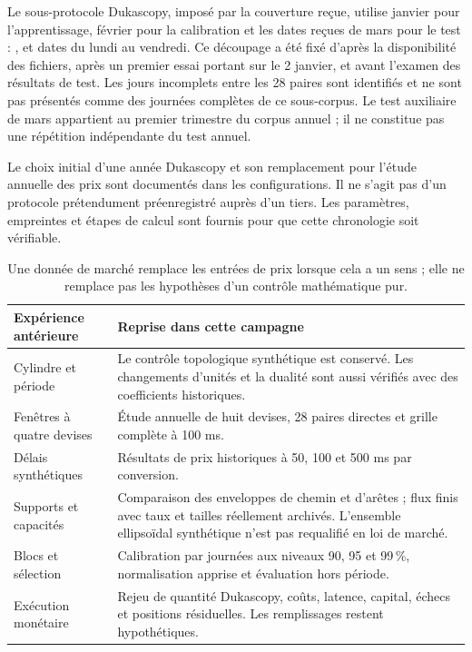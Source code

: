 Le sous-protocole Dukascopy, imposé par la couverture reçue, utilise janvier pour l'apprentissage, février pour la calibration et les dates reçues de mars pour le test : \EmpDukaTrain{}, \EmpDukaCal{} et \EmpDukaTest{} dates du lundi au vendredi. Ce découpage a été fixé d'après la disponibilité des fichiers, après un premier essai portant sur le 2 janvier, et avant l'examen des résultats de test. Les jours incomplets entre les 28 paires sont identifiés et ne sont pas présentés comme des journées complètes de ce sous-corpus. Le test auxiliaire de mars appartient au premier trimestre du corpus annuel ; il ne constitue pas une répétition indépendante du test annuel.

Le choix initial d'une année Dukascopy et son remplacement pour l'étude annuelle des prix sont documentés dans les configurations. Il ne s'agit pas d'un protocole prétendument préenregistré auprès d'un tiers. Les paramètres, empreintes et étapes de calcul sont fournis pour que cette chronologie soit vérifiable.

\begin{table}[H]\centering\small
\begin{tabularx}{\linewidth}{@{}p{35mm}Y@{}}
\toprule
Expérience antérieure & Reprise dans cette campagne\\
\midrule
Cylindre et période & Le contrôle topologique synthétique est conservé. Les changements d'unités et la dualité sont aussi vérifiés avec des coefficients historiques.\\
Fenêtres à quatre devises & Étude annuelle de huit devises, 28 paires directes et grille complète à 100 ms.\\
Délais synthétiques & Résultats de prix historiques à 50, 100 et 500 ms par conversion.\\
Supports et capacités & Comparaison des enveloppes de chemin et d'arêtes ; flux finis avec taux et tailles réellement archivés. L'ensemble ellipsoïdal synthétique n'est pas requalifié en loi de marché.\\
Blocs et sélection & Calibration par journées aux niveaux 90, 95 et 99\,\%, normalisation apprise et évaluation hors période.\\
Exécution monétaire & Rejeu de quantité Dukascopy, coûts, latence, capital, échecs et positions résiduelles. Les remplissages restent hypothétiques.\\
\bottomrule
\end{tabularx}
\caption{Une donnée de marché remplace les entrées de prix lorsque cela a un sens ; elle ne remplace pas les hypothèses d'un contrôle mathématique pur.}
\end{table}

